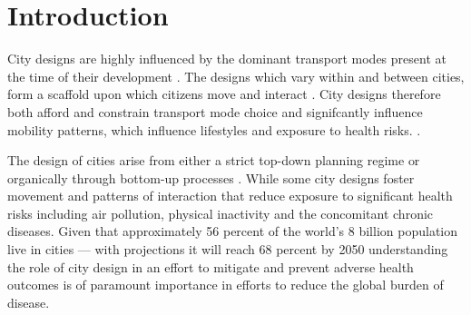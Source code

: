 \documentclass[preprint,12pt]{elsarticle}
\begin{document}
\begin{frontmatter}








\end{frontmatter}



\section*{Introduction}

City designs are highly influenced by the dominant transport modes present at the time of their development \cite{KNOWLES2020102607}. The designs which vary within and between cities, form a scaffold upon which citizens move and interact \cite{Thompson2020}. City designs therefore both afford and constrain transport mode choice and signifcantly influence mobility patterns, which influence lifestyles and exposure to health risks. \cite{WHO2023}.

The design of cities arise from either a  strict top-down planning regime \cite{mundigo1977city} or organically through bottom-up processes \cite{batty2017thinking}. While some city designs foster movement and patterns of interaction that reduce exposure to significant health risks including air pollution, physical inactivity and the concomitant chronic diseases\cite{Wijnands2022, Stevenson2016,wang2023flood, stanley2022managing}. Given that approximately 56 percent of the world's 8 billion population live in cities — with projections it will reach 68 percent by 2050 \cite{WHO2023} understanding the role of city design in an effort to mitigate and prevent adverse health outcomes is of paramount importance in efforts to reduce the global burden of disease. 
\end{document}
